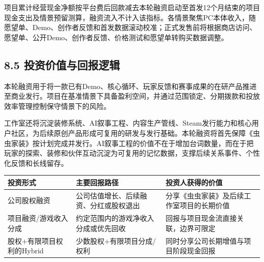 \documentclass[UTF8,fontset=none,zihao=5,twoside]{ctexart}
\newcounter{none}
\newenvironment{BusinessTable}{%
  \begingroup
  \small
  \setlength{\parindent}{0pt}%
  \setlength{\parskip}{0pt}%
  \rowcolors{2}{TableAlt}{white}%
}{%
  \endgroup
}
\begin{document}
项目累计经营现金净额按平台费后回款减去本轮融资启动至首发12个月结束的项目现金支出及情景预留测算，融资流入不计入该指标。各情景聚焦PC本体收入，随愿望单、Demo、创作者反馈和首发数据滚动校准；正式发售前将根据商店访问、愿望单、公开Demo、创作者反馈、价格测试和愿望单转购买数据调整。

\subsection{8.5 投资价值与回报逻辑}\label{85-ux6295ux8d44ux4ef7ux503cux4e0eux56deux62a5ux903bux8f91}

本轮融资用于将一款已有Demo、核心循环、玩家反馈和赛事成果的在研产品推进至商业发行。项目在基准情景下具备盈利空间，并通过范围锁定、分期拨款和投放效率管理控制保守情景下的风险。

工作室还将沉淀装修系统、AI叙事工程、内容生产管线、Steam发行能力和核心用户社区，为后续原创产品形成可复用的研发与发行基础。本轮融资将首先保障《虫虫家装》按计划完成并发行。AI叙事工程的价值不在于增加台词数量，而在于把玩家的探索、装修和伙伴互动沉淀为可复用的记忆数据，支撑后续关系事件、个性化反馈和长线留存。

\begin{BusinessTable}

{\def\LTcaptype{none} %
\begin{longtable}[]{@{}
  >{\raggedright\arraybackslash}p{}
  >{\raggedright\arraybackslash}p{}
  >{\raggedright\arraybackslash}p{}@{}}
\toprule\noalign{}
\begin{minipage}[b]{\linewidth}\raggedright
\cellcolor{TableHeader}\color{BrandBlue}\bfseries 投资形式
\end{minipage} & \begin{minipage}[b]{\linewidth}\raggedright
\cellcolor{TableHeader}\color{BrandBlue}\bfseries 主要回报路径
\end{minipage} & \begin{minipage}[b]{\linewidth}\raggedright
\cellcolor{TableHeader}\color{BrandBlue}\bfseries 投资人获得的价值
\end{minipage} \\
\midrule\noalign{}
\endhead
\bottomrule\noalign{}
\endlastfoot
公司股权融资 & 公司估值增长、后续融资、分红或股权退出 & 分享《虫虫家装》及后续工作室项目的长期价值 \\
项目融资/游戏收入分成 & 约定范围内的游戏净收入分成或优先回收 & 回报与项目现金流直接关联，边界可限定 \\
股权+有限项目权利的Hybrid & 少数股权+有限项目分成/权利 & 同时分享公司长期增值与项目阶段现金回报 \\
\end{longtable}
}

\end{BusinessTable}
\end{document}

